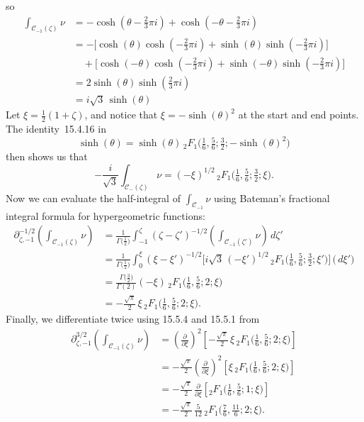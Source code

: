 \documentclass{article}
\newcommand{\fracderiv}[3]{\partial^{#1}_{#2, #3}}
\theoremstyle{definition}
\theoremstyle{plain}
\begin{document}
so
\begin{align*}
\int_{\mathcal{C}_{-1}(\zeta)} \nu & =- \cosh(\theta - \tfrac{2}{3}\pi i) + \cosh(-\theta - \tfrac{2}{3}\pi i) \\
& =- \big[\cosh(\theta) \cosh(-\tfrac{2}{3}\pi i) + \sinh(\theta) \sinh(-\tfrac{2}{3}\pi i)\big] \\
& \quad + \big[\cosh(-\theta) \cosh(-\tfrac{2}{3}\pi i) + \sinh(-\theta) \sinh(-\tfrac{2}{3}\pi i)\big] \\
& = 2\sinh(\theta) \sinh(\tfrac{2}{3}\pi i) \\
& = i\sqrt{3}\,\sinh(\theta)
\end{align*}
Let $\xi = \tfrac{1}{2}(1 + \zeta)$, and notice that $\xi =- \sinh( \theta)^2$ at the start and end points. The identity~15.4.16 in \cite{dlmf}
\[ \sinh(\theta) = \sinh(\theta)\, {}_2F_1\big(\tfrac{1}{6}, \tfrac{5}{6}; \tfrac{3}{2}; -\sinh(\theta)^2\big) \]
then shows us that
\[ -\frac{i}{\sqrt{3}} \int_{\mathcal{C}_-(\zeta)} \nu =  (-\xi)^{1/2}\, {}_2F_1\big(\tfrac{1}{6}, \tfrac{5}{6}; \tfrac{3}{2}; \xi\big). \]
Now we can evaluate the half-integral of $\int_{\mathcal{C}_{-1}} \nu$ using Bateman's fractional integral formula for hypergeometric functions: \begin{align*}
\fracderiv{-1/2}{\zeta}{-1}\left( \int_{\mathcal{C}_{-1}(\zeta)} \nu \right) & = \frac{1}{\Gamma\big(\tfrac{1}{2}\big)} \int_{-1}^\zeta (\zeta - \zeta')^{-1/2} \left( \int_{\mathcal{C}_{-1}(\zeta')} \nu \right)\,d\zeta' \\
& = \frac{1}{\Gamma\big(\tfrac{1}{2}\big)} \int_0^\xi  (\xi - \xi')^{-1/2} \Big[{i}{\sqrt{3}}\, (-\xi')^{1/2}\, {}_2F_1\big(\tfrac{1}{6}, \tfrac{5}{6}; \tfrac{3}{2}; \xi' \big) \Big] \,\big( \,d\xi' \big) \\
& =  \frac{\Gamma\big(\tfrac{3}{2}\big)}{\Gamma(2)} (-\xi)\, {}_2F_1\big(\tfrac{1}{6}, \tfrac{5}{6}; 2; \xi\big) \\
& = - \tfrac{\sqrt{\pi}}{2}\,\xi\,{}_2F_1\big(\tfrac{1}{6}, \tfrac{5}{6}; 2; \xi\big).
\end{align*}
Finally, we differentiate twice using 15.5.4 and 15.5.1 from \cite{dlmf}
\begin{align*}
\fracderiv{3/2}{\zeta}{-1} \left( \int_{\mathcal{C}_{-1}(\zeta)} \nu \right) & = \left(\tfrac{\partial}{\partial \xi}\right)^2 \left[ - \tfrac{\sqrt{\pi}}{2} \,\xi\, {}_2F_1\big(\tfrac{1}{6}, \tfrac{5}{6}; 2; \xi\big) \right] \\
& = - \tfrac{\sqrt{\pi}}{2} \left(\tfrac{\partial}{\partial \xi}\right)^2 \left[ \xi\, {}_2F_1\big(\tfrac{1}{6}, \tfrac{5}{6}; 2; \xi\big) \right] \\
& = - \tfrac{\sqrt{\pi}}{2}\,\tfrac{\partial}{\partial \xi} \left[ {}_2F_1\big(\tfrac{1}{6}, \tfrac{5}{6}; 1; \xi\big) \right] \\
& = - \tfrac{\sqrt{\pi}}{2}\,\tfrac{5}{12}\, {}_2F_1\big(\tfrac{7}{6}, \tfrac{11}{6}; 2; \xi\big).
\end{align*}
\end{document}
